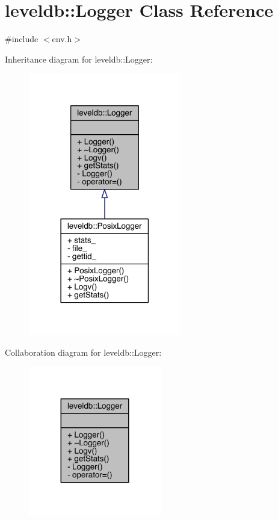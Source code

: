 \hypertarget{classleveldb_1_1_logger}{}\section{leveldb\+:\+:Logger Class Reference}
\label{classleveldb_1_1_logger}


{\ttfamily \#include $<$env.\+h$>$}



Inheritance diagram for leveldb\+:\+:Logger\+:
\nopagebreak
\begin{figure}[H]
\begin{center}
\leavevmode
\includegraphics[width=189pt]{classleveldb_1_1_logger__inherit__graph}
\end{center}
\end{figure}


Collaboration diagram for leveldb\+:\+:Logger\+:
\nopagebreak
\begin{figure}[H]
\begin{center}
\leavevmode
\includegraphics[width=164pt]{classleveldb_1_1_logger__coll__graph}
\end{center}
\end{figure}
